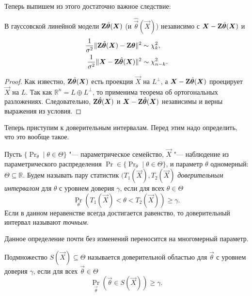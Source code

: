 Теперь выпишем из этого достаточно важное следствие:
\begin{consequence}
	В гауссовской линейной модели $\mathbf{Z}\hat{\bm{\theta}}(\bm{X})$ (и $\hat{\vec{\theta}}(\vec{X})$) независимо с $\bm{X} - \mathbf{Z}\hat{\bm{\theta}}(\bm{X})$ и
	\begin{align*}
		\frac{1}{\sigma^{2}}\|\mathbf{Z}\hat{\bm{\theta}}(\bm{X}) - \mathbf{Z}\bm{\theta}\|^{2} &\sim \chi^{2}_{k}, \\
		\frac{1}{\sigma^{2}}\|\bm{X} - \mathbf{Z}\hat{\bm{\theta}}(\bm{X})\|^{2} &\sim \chi^{2}_{n - k}. 
	\end{align*}
\end{consequence}
\begin{proof}
	Как известно, $\mathbf{Z}\hat{\bm{\theta}}(\bm{X})$ есть проекция $\vec{X}$ на $L^{\perp}$, а $\bm{X} - \mathbf{Z}\hat{\bm{\theta}}(\bm{X})$ проецирует $\vec{X}$ на $L$. Так как $\mathbb{R}^{n} = L \oplus L^{\perp}$, то применима теорема об ортогональных разложениях. Следовательно, $\mathbf{Z}\hat{\bm{\theta}}(\bm{X})$ и $\bm{X} - \mathbf{Z}\hat{\bm{\theta}}(\bm{X})$ независимы и верны выражения из условия.
\end{proof}
Теперь приступим к доверительным интервалам. Перед этим надо определить, что это вообще такое.
\begin{definition}
	Пусть $\{\Pr_{\theta} \mid \theta \in \Theta\}$ "--- параметрическое семейство, $\vec{X}$ "--- наблюдение из параметрического распределения $\Pr \in \{\Pr_{\theta} \mid \theta \in \Theta\}$, и параметр $\theta$ одномерный: $\Theta \subseteq \mathbb{R}$. Будем называть пару статистик $(T_{1}(\vec{X}), T_{2}(\vec{X})$ \emph{доверительным интервалом} для $\theta$ с уровнем доверия $\gamma$, если для всех $\theta \in \Theta$
	\[
		\Pr_{\theta}(T_{1}(\vec{X}) < \theta < T_{2}(\vec{X})) \geq \gamma.
	\]
	Если в данном неравенстве всегда достигается равенство, то доверительный интервал называют \emph{точным}.
\end{definition}
Данное определение почти без изменений переносится на многомерный параметр.
\begin{definition}
	Подмножество $S(\vec{X}) \subseteq \Theta$ называется доверительной областью для $\vec{\theta}$ с уровнем доверия $\gamma$, если для всех $\vec{\theta} \in \Theta$
	\[
		\Pr_{\vec{\theta}}(\vec{\theta} \in S(\vec{X})) \geq \gamma.
	\]
\end{definition}

